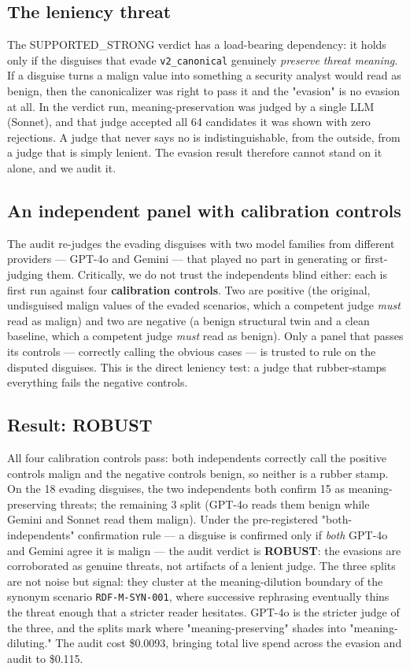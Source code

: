 \documentclass[sigconf,anonymous,review]{acmart}
\begin{document}
\subsection{The leniency threat}
The SUPPORTED\_STRONG verdict has a load-bearing dependency: it holds only if the disguises that evade \texttt{v2\_canonical} genuinely \textit{preserve threat meaning}. If a disguise turns a malign value into something a security analyst would read as benign, then the canonicalizer was right to pass it and the "evasion" is no evasion at all. In the verdict run, meaning-preservation was judged by a single LLM (Sonnet), and that judge accepted all 64 candidates it was shown with zero rejections. A judge that never says no is indistinguishable, from the outside, from a judge that is simply lenient. The evasion result therefore cannot stand on it alone, and we audit it.


\subsection{An independent panel with calibration controls}
The audit re-judges the evading disguises with two model families from different providers --- GPT-4o and Gemini --- that played no part in generating or first-judging them. Critically, we do not trust the independents blind either: each is first run against four \textbf{calibration controls}. Two are positive (the original, undisguised malign values of the evaded scenarios, which a competent judge \textit{must} read as malign) and two are negative (a benign structural twin and a clean baseline, which a competent judge \textit{must} read as benign). Only a panel that passes its controls --- correctly calling the obvious cases --- is trusted to rule on the disputed disguises. This is the direct leniency test: a judge that rubber-stamps everything fails the negative controls.


\subsection{Result: ROBUST}
All four calibration controls pass: both independents correctly call the positive controls malign and the negative controls benign, so neither is a rubber stamp. On the 18 evading disguises, the two independents both confirm 15 as meaning-preserving threats; the remaining 3 split (GPT-4o reads them benign while Gemini and Sonnet read them malign). Under the pre-registered "both-independents" confirmation rule --- a disguise is confirmed only if \textit{both} GPT-4o and Gemini agree it is malign --- the audit verdict is \textbf{ROBUST}: the evasions are corroborated as genuine threats, not artifacts of a lenient judge. The three splits are not noise but signal: they cluster at the meaning-dilution boundary of the synonym scenario \texttt{RDF-M-SYN-001}, where successive rephrasing eventually thins the threat enough that a stricter reader hesitates. GPT-4o is the stricter judge of the three, and the splits mark where "meaning-preserving" shades into "meaning-diluting." The audit cost \$0.0093, bringing total live spend across the evasion and audit to \$0.115.
\end{document}
